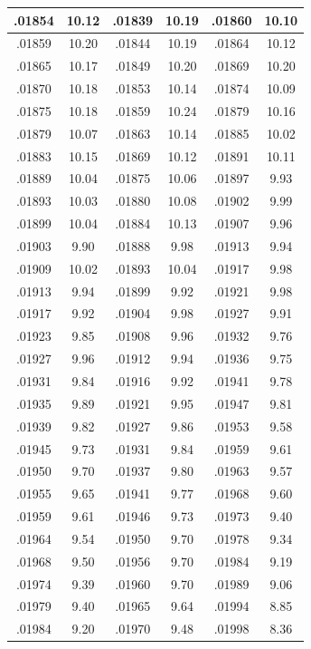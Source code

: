 \documentclass[10pt,twoside]{report}
\begin{document}
\begin{appendices}
\begin{longtable}{|c|c||c|c||c|c|}
.01854 & 10.12 & .01839 & 10.19 & .01860 & 10.10\\\hline
.01859 & 10.20 & .01844 & 10.19 & .01864 & 10.12\\\hline
.01865 & 10.17 & .01849 & 10.20 & .01869 & 10.20\\\hline
.01870 & 10.18 & .01853 & 10.14 & .01874 & 10.09\\\hline
.01875 & 10.18 & .01859 & 10.24 & .01879 & 10.16\\\hline
.01879 & 10.07 & .01863 & 10.14 & .01885 & 10.02\\\hline
.01883 & 10.15 & .01869 & 10.12 & .01891 & 10.11\\\hline
.01889 & 10.04 & .01875 & 10.06 & .01897 & 9.93\\\hline
.01893 & 10.03 & .01880 & 10.08 & .01902 & 9.99\\\hline
.01899 & 10.04 & .01884 & 10.13 & .01907 & 9.96\\\hline
.01903 & 9.90 & .01888 & 9.98 & .01913 & 9.94\\\hline
.01909 & 10.02 & .01893 & 10.04 & .01917 & 9.98\\\hline
.01913 & 9.94 & .01899 & 9.92 & .01921 & 9.98\\\hline
.01917 & 9.92 & .01904 & 9.98 & .01927 & 9.91\\\hline
.01923 & 9.85 & .01908 & 9.96 & .01932 & 9.76\\\hline
.01927 & 9.96 & .01912 & 9.94 & .01936 & 9.75\\\hline
.01931 & 9.84 & .01916 & 9.92 & .01941 & 9.78\\\hline
.01935 & 9.89 & .01921 & 9.95 & .01947 & 9.81\\\hline
.01939 & 9.82 & .01927 & 9.86 & .01953 & 9.58\\\hline
.01945 & 9.73 & .01931 & 9.84 & .01959 & 9.61\\\hline
.01950 & 9.70 & .01937 & 9.80 & .01963 & 9.57\\\hline
.01955 & 9.65 & .01941 & 9.77 & .01968 & 9.60\\\hline
.01959 & 9.61 & .01946 & 9.73 & .01973 & 9.40\\\hline
.01964 & 9.54 & .01950 & 9.70 & .01978 & 9.34\\\hline
.01968 & 9.50 & .01956 & 9.70 & .01984 & 9.19\\\hline
.01974 & 9.39 & .01960 & 9.70 & .01989 & 9.06\\\hline
.01979 & 9.40 & .01965 & 9.64 & .01994 & 8.85\\\hline
.01984 & 9.20 & .01970 & 9.48 & .01998 & 8.36\\\hline

\end{longtable}
\end{appendices}
\end{document}
